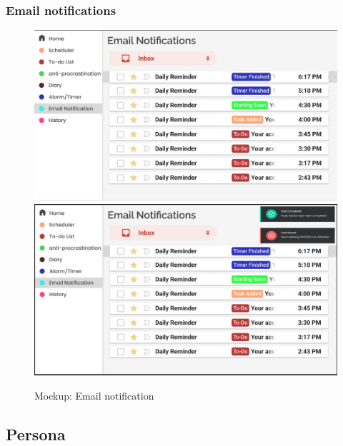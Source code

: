 \documentclass[a4paper]{article}
\begin{document}
\subsubsection{Email notifications}

\begin{figure}[H] %
	\centering %
	\includegraphics[width=1\textwidth]{./images/Mockup_Email_normal.png}
	\includegraphics[width=1\textwidth]{./images/Mockup_Email.png} %
	\caption*{Mockup: Email notification} %
	\label{Fig.Email} %
\end{figure}

\subsection{Persona}
\end{document}
